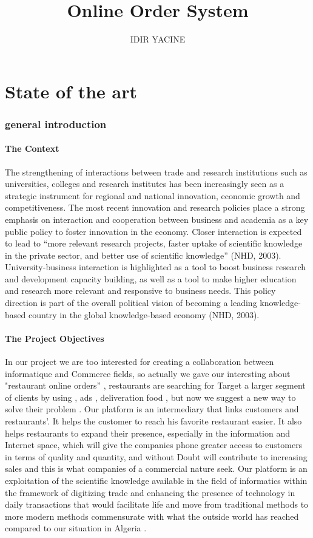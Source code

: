 \documentclass{article}
\title {Online Order System}
\author{IDIR YACINE}
\begin{document}
\maketitle
\tableofcontents

\part{State of the art}
\section{general introduction}
\subsection{The Context}
The strengthening of interactions between trade and research institutions such as universities, colleges and research institutes has been increasingly seen as a strategic instrument for regional and national innovation, economic growth and competitiveness. The most recent innovation and research policies place a strong emphasis on interaction and cooperation between business and academia as a key public policy to foster innovation in the economy. Closer interaction is expected to lead to “more relevant research projects, faster uptake of scientific knowledge in the private sector, and better use of scientific knowledge” (NHD, 2003).
University-business interaction is highlighted as a tool to boost business research and development capacity building, as well as a tool to make higher education and research more relevant and responsive to business needs. This policy direction is part of the overall political vision of becoming a leading knowledge-based country in the global knowledge-based economy (NHD, 2003).
\subsection{The Project Objectives}
In our project we are too interested for creating a collaboration between informatique and Commerce fields, so actually we gave our interesting about "restaurant online orders” , restaurants are searching  for Target a larger segment of clients by using , ads , deliveration food , but now we suggest  a new way to solve their problem . 
Our platform is an intermediary that links customers and restaurants’. It helps the customer to reach his favorite restaurant easier. It also helps restaurants to expand their presence, especially in the information and Internet space, which will give the companies phone greater access to customers in terms of quality and quantity, and without Doubt will contribute to increasing sales and this is what companies of a commercial nature seek.
     Our platform is an exploitation of the scientific knowledge available in the field of informatics within the framework of digitizing trade and enhancing the presence of technology in daily transactions that would facilitate life and move from traditional methods to more modern methods commensurate with what the outside world has reached compared to our situation in Algeria .
\end{document}
